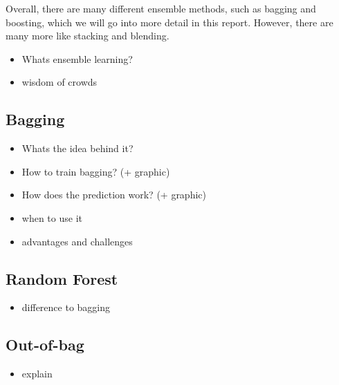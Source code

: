 Overall, there are many different ensemble methods, such as bagging and boosting, 
which we will go into more detail in this report. However, there are many more 
like stacking and blending.

%

\begin{itemize}
    \item Whats ensemble learning?
    \item wisdom of crowds
\end{itemize}

\subsection{Bagging}
\begin{itemize}
    \item Whats the idea behind it?
    \item How to train bagging? (+ graphic)
    \item How does the prediction work? (+ graphic)
    \item when to use it
    \item advantages and challenges
\end{itemize}

\subsection{Random Forest}
\begin{itemize}
    \item difference to bagging
\end{itemize}

\subsection{Out-of-bag}
\begin{itemize}
    \item explain
\end{itemize}

